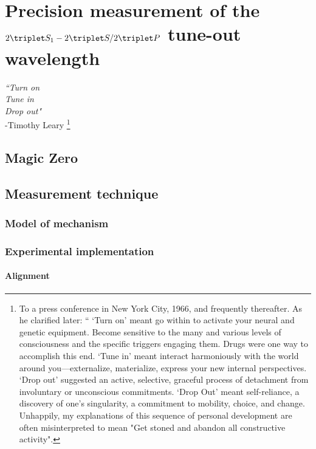 
\chapter{Precision measurement of the $2\triplet S_1 - 2 \triplet S/2\triplet P$ tune-out wavelength}
\label{chap:tuneout}

\begin{adjustwidth}{3cm}{0cm}
\begin{flushright}
{\emph{``Turn on\\
		Tune in\\
		Drop out"\\} 
-Timothy Leary \footnote{To a press conference in New York City, 1966, and frequently thereafter.
	As he clarified later: `` `Turn on' meant go within to activate your neural and genetic equipment.
	Become sensitive to the many and various levels of consciousness and the specific triggers engaging them.
	Drugs were one way to accomplish this end.
	`Tune in' meant interact harmoniously with the world around you—externalize, materialize, express your new internal perspectives.
	`Drop out' suggested an active, selective, graceful process of detachment from involuntary or unconscious commitments.
	`Drop Out' meant self-reliance, a discovery of one's singularity, a commitment to mobility, choice, and change.
	Unhappily, my explanations of this sequence of personal development are often misinterpreted to mean "Get stoned and abandon all constructive activity".}}
\end{flushright}
\end{adjustwidth}

\section{Magic Zero}\label{sec:to-history}
\section{Measurement technique}\label{sec:to-method}
\subsection{Model of mechanism}\label{ssec:to-model}
\subsection{Experimental implementation}\label{ssec:to-expt}
\subsubsection*{Alignment}
